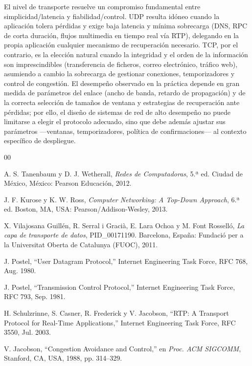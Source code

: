 \documentclass[conference]{IEEEtran}
\begin{document}
El nivel de transporte resuelve un compromiso fundamental entre simplicidad/latencia y fiabilidad/control. UDP resulta idóneo cuando la aplicación tolera pérdidas y exige baja latencia y mínima sobrecarga (DNS, RPC de corta duración, flujos multimedia en tiempo real vía RTP), delegando en la propia aplicación cualquier mecanismo de recuperación necesario. TCP, por el contrario, es la elección natural cuando la integridad y el orden de la información son imprescindibles (transferencia de ficheros, correo electrónico, tráfico web), asumiendo a cambio la sobrecarga de gestionar conexiones, temporizadores y control de congestión. El desempeño observado en la práctica depende en gran medida de parámetros del enlace (ancho de banda, retardo de propagación) y de la correcta selección de tamaños de ventana y estrategias de recuperación ante pérdidas; por ello, el diseño de sistemas de red de alto desempeño no puede limitarse a elegir el protocolo adecuado, sino que debe además ajustar sus parámetros —ventanas, temporizadores, política de confirmaciones— al contexto específico de despliegue.

\begin{thebibliography}{00}

 A. S. Tanenbaum y D. J. Wetherall, \emph{Redes de Computadoras}, 5.ª ed. Ciudad de México, México: Pearson Educación, 2012.

 J. F. Kurose y K. W. Ross, \emph{Computer Networking: A Top-Down Approach}, 6.ª ed. Boston, MA, USA: Pearson/Addison-Wesley, 2013.

 X. Vilajosana Guillén, R. Serral i Gracià, E. Lara Ochoa y M. Font Rosselló, \emph{La capa de transporte de datos}, PID\_00171190. Barcelona, España: Fundació per a la Universitat Oberta de Catalunya (FUOC), 2011.

 J. Postel, ``User Datagram Protocol,'' Internet Engineering Task Force, RFC 768, Aug. 1980.

 J. Postel, ``Transmission Control Protocol,'' Internet Engineering Task Force, RFC 793, Sep. 1981.

 H. Schulzrinne, S. Casner, R. Frederick y V. Jacobson, ``RTP: A Transport Protocol for Real-Time Applications,'' Internet Engineering Task Force, RFC 3550, Jul. 2003.

 V. Jacobson, ``Congestion Avoidance and Control,'' en \emph{Proc. ACM SIGCOMM}, Stanford, CA, USA, 1988, pp. 314--329.

\end{thebibliography}
\end{document}
